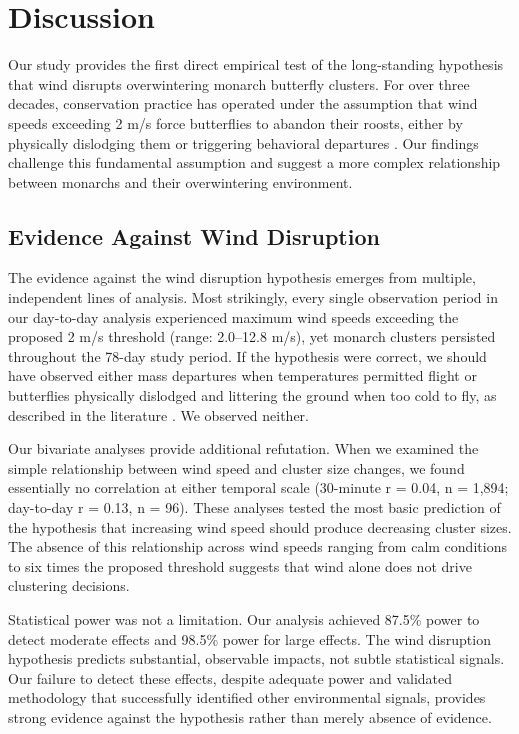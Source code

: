 \section{Discussion}

Our study provides the first direct empirical test of the long-standing hypothesis that wind disrupts overwintering monarch butterfly clusters. For over three decades, conservation practice has operated under the assumption that wind speeds exceeding 2 m/s force butterflies to abandon their roosts, either by physically dislodging them or triggering behavioral departures \parencite{leongEvaluationManagementCalifornia2016}. Our findings challenge this fundamental assumption and suggest a more complex relationship between monarchs and their overwintering environment.

\subsection{Evidence Against Wind Disruption}

The evidence against the wind disruption hypothesis emerges from multiple, independent lines of analysis. Most strikingly, every single observation period in our day-to-day analysis experienced maximum wind speeds exceeding the proposed 2 m/s threshold (range: 2.0--12.8 m/s), yet monarch clusters persisted throughout the 78-day study period. If the hypothesis were correct, we should have observed either mass departures when temperatures permitted flight or butterflies physically dislodged and littering the ground when too cold to fly, as described in the literature \parencite{leongRestorationOverwinteringGrove1999}. We observed neither.

Our bivariate analyses provide additional refutation. When we examined the simple relationship between wind speed and cluster size changes, we found essentially no correlation at either temporal scale (30-minute r = 0.04, n = 1,894; day-to-day r = 0.13, n = 96). These analyses tested the most basic prediction of the hypothesis that increasing wind speed should produce decreasing cluster sizes. The absence of this relationship across wind speeds ranging from calm conditions to six times the proposed threshold suggests that wind alone does not drive clustering decisions.

Statistical power was not a limitation. Our analysis achieved 87.5\% power to detect moderate effects and 98.5\% power for large effects. The wind disruption hypothesis predicts substantial, observable impacts, not subtle statistical signals. Our failure to detect these effects, despite adequate power and validated methodology that successfully identified other environmental signals, provides strong evidence against the hypothesis rather than merely absence of evidence.

